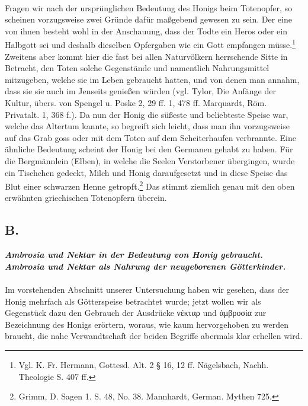 \documentclass[a4paper, 11pt, oneside]{article}
\begin{document}
\paragraph{}
Fragen wir nach der ursprünglichen Bedeutung des Honigs beim Totenopfer, so scheinen vorzugsweise zwei Gründe dafür maßgebend gewesen zu sein. Der eine von ihnen besteht wohl in der Anschauung, dass der Todte ein Heros oder ein Halbgott sei und deshalb dieselben Opfergaben wie ein Gott empfangen müsse.\footnote{Vgl. K. Fr. Hermann, Gottesd. Alt. 2 § 16, 12 ff. Nägelsbach, Nachh. Theologie S. 407 ff.} Zweitens aber kommt hier die fast bei allen Naturvölkern herrschende Sitte in Betracht, den Toten solche Gegenstände und namentlich Nahrungsmittel mitzugeben, welche sie im Leben gebraucht hatten, und von denen man annahm, dass sie sie auch im Jenseits genießen würden (vgl. Tylor, Die Anfänge der Kultur, übers. von Spengel u. Poske 2, 29 ff. 1, 478 ff. Marquardt, Röm. Privatalt. 1, 368 f.). Da nun der Honig die süßeste und beliebteste Speise war, welche das Altertum kannte, so begreift sich leicht, dass man ihn vorzugsweise auf das Grab goss oder mit dem Toten auf dem Scheiterhaufen verbrannte. Eine ähnliche Bedeutung scheint der Honig bei den Germanen gehabt zu haben. Für die Bergmännlein (Elben), in welche die Seelen Verstorbener übergingen, wurde ein Tischchen gedeckt, Milch und Honig daraufgesetzt und in diese Speise das Blut einer schwarzen Henne getropft.\footnote{Grimm, D. Sagen 1. S. 48, No. 38. Mannhardt, German. Mythen 725.} Das stimmt ziemlich genau mit den oben erwähnten griechischen Totenopfern überein.

\subsection{B.}
\begin{center}
\textbf{\emph{Ambrosia und Nektar in der Bedeutung von Honig gebraucht. Ambrosia und Nektar als Nahrung der neugeborenen Götterkinder.}}
\end{center}
\paragraph{}
Im vorstehenden Abschnitt unserer Untersuchung haben wir gesehen, dass der Honig mehrfach als Götterspeise betrachtet wurde; jetzt wollen wir als Gegenstück dazu den Gebrauch der Ausdrücke νέκταρ und ἀμβροσία zur Bezeichnung des Honigs erörtern, woraus, wie kaum hervorgehoben zu werden braucht, die nahe Verwandtschaft der beiden Begriffe abermals klar erhellen wird.
\end{document}
